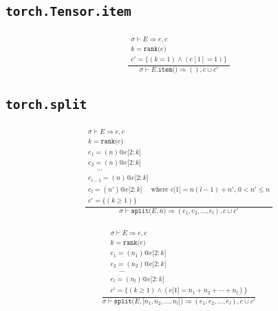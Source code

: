 \documentclass{article}
\makeatletter
\newcommand{\Rar}{\Rightarrow}
\newcommand{\mtt}[1]{\mathtt{#1}}
\newcommand{\bigspace}{\,\,\,\,\,\,\,\,}
\newcommand{\op}[2]{\mtt{#1(}#2\mtt{)}}
\newcommand{\conc}{\mtt{@}}
\newcommand{\ind}[1]{\mtt{[}#1\mtt{]}}
\newcommand{\indr}[2]{\mtt{[}#1\mtt{:}#2\mtt{]}}
\makeatother
\begin{document}
\subsection*{\texttt{torch.Tensor.item}}%
\begin{align*}
  \frac
  {
    \begin{array}{l}
      \sigma \vdash E \Rar e, c \\
      k = \op{rank}{e} \\
      c' = \{ (k = 1) \land (e[1] = 1) \}
    \end{array}
  }
  {
    \sigma \vdash E.\op{item}{} \Rar (), c \cup c'
  }
\end{align*}%

\subsection*{\texttt{torch.split}}%
\begin{align*}
  \frac
  {
    \begin{array}{l}
      \sigma \vdash E \Rar e, c \\
      k = \op{rank}{e} \\
      e_1 = (n) \conc e\indr{2}{k} \\
      e_2 = (n) \conc e\indr{2}{k} \\
      \bigspace \cdots \\
      e_{l-1} = (n) \conc e\indr{2}{k} \\
      e_l = (n') \conc e\indr{2}{k}\bigspace
        \text{where $e \ind{1} = n(l-1) + n'$, $0 < n' \leq n$} \\
      c' = \{ (k \geq 1) \}
    \end{array}
  }
  {
    \sigma \vdash \op{split}{E, n} \Rar (e_1, e_2, \dots, e_l), c \cup c'
  }
  \tag*{$l$-원소 tuple 형태로 반환}
\end{align*}

\begin{align*}
  \frac
  {
    \begin{array}{l}
      \sigma \vdash E \Rar e, c \\
      k = \op{rank}{e} \\
      e_1 = (n_1) \conc e\indr{2}{k} \\
      e_2 = (n_2) \conc e\indr{2}{k} \\
      \bigspace \cdots \\
      e_l = (n_l) \conc e\indr{2}{k} \\
      c' = \{ (k \geq 1) \land (e \ind{1} = n_1 + n_2 + \cdots + n_l) \}
    \end{array}
  }
  {
    \sigma \vdash \op{split}{E, \ind{n_1, n_2, \dots, n_l}}
      \Rar (e_1, e_2, \dots, e_l), c \cup c'
  }
  \tag*{$l$-원소 tuple 형태로 반환}
\end{align*}
\end{document}
